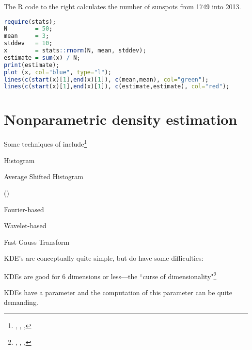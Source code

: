 \begin{minipage}{\tw-115mm}
\begin{example}
The R code to the right
calculates the   number of sunspots
from 1749 into 2013.
\end{example}
\end{minipage}
\hfill
\begin{minipage}{110mm}
\begin{lstlisting}[language=R]
require(stats);
N        = 50;
mean     = 3;
stddev   = 10;
x        = stats::rnorm(N, mean, stddev);
estimate = sum(x) / N;
print(estimate);
plot (x, col="blue", type="l");
lines(c(start(x)[1],end(x)[1]), c(mean,mean), col="green");
lines(c(start(x)[1],end(x)[1]), c(estimate,estimate), col="red");
\end{lstlisting}
\end{minipage}

\section{Nonparametric density estimation}
Some techniques of  include\footnote{
  ,
  ,
  ,
  }
\begin{listi}
  \item Histogram %
  \item Average Shifted Histogram
  \item {} ()
  \item Fourier-based
  \item Wavelet-based
  \item Fast Gauss Transform
\end{listi}

KDE's are conceptually quite simple, but do have some difficulties:
\begin{listi}
  \item KDEs are good for 6 dimensions or less---the ``curse of dimensionality"\footnote{
        ,
        ,
        ,
        }
  \item KDEs have a  parameter and the computation of this parameter can be quite demanding.
\end{listi}

